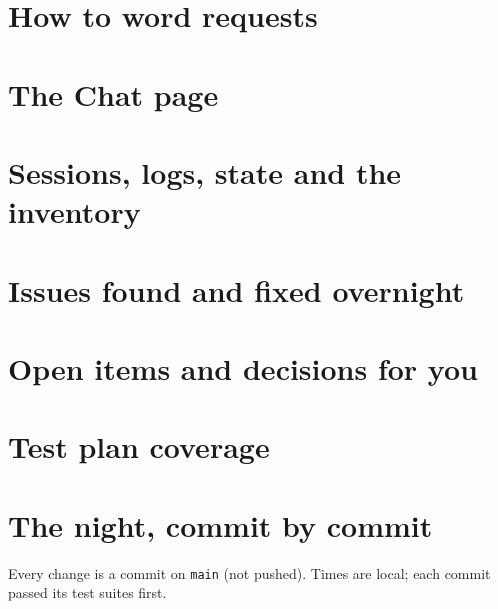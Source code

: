 \documentclass[10.5pt,a4paper]{article}
\newcommand{\code}[1]{\texttt{\small #1}}
\begin{document}
\section{How to word requests}


\section{The Chat page}


\section{Sessions, logs, state and the inventory}


\section{Issues found and fixed overnight}\label{sec:issues}


\section{Open items and decisions for you}\label{sec:open}
{\sloppy\par}

\appendix
\section{Test plan coverage}


\section{The night, commit by commit}
Every change is a commit on \code{main} (not pushed). Times are local; each commit passed its test suites first.

{\small}
\end{document}
